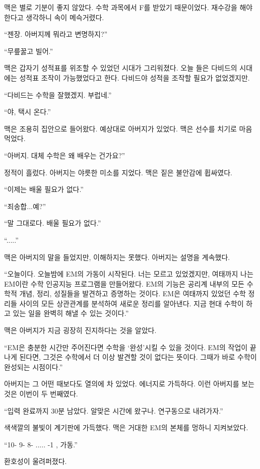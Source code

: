 \documentclass[9pt,showtrims,twoside,openright,chapter]{oblivoir}
\begin{document}
 맥은 별로 기분이 좋지 않았다. 수학 과목에서 F를 받았기 때문이었다. 재수강을 해야 한다고 생각하니 속이 메슥거렸다. \par
 “젠장. 아버지께 뭐라고 변명하지?” \par
 “무릎꿇고 빌어.” \par
 맥은 갑자기 성적표를 위조할 수 있었던 시대가 그리워졌다. 오늘 들은 다비드의 시대에는 성적표 조작이 가능했었다고 한다. 다비드야 성적을 조작할 필요가 없었겠지만. \par
 “다비드는 수학을 잘했겠지. 부럽네.” \par
 “야, 택시 온다.”
\\ \par
 맥은 조용히 집안으로 들어왔다. 예상대로 아버지가 있었다. 맥은 선수를 치기로 마음먹었다. \par
 “아버지. 대체 수학은 왜 배우는 건가요?” \par
 정적이 흘렀다. 아버지는 야릇한 미소를 지었다. 맥은 짙은 불안감에 휩싸였다. \par
 “이제는 배울 필요가 없다.” \par
 “죄송합...예?” \par
 “말 그대로다. 배울 필요가 없다.” \par
 “.....” \par
 맥은 아버지의 말을 들었지만, 이해하지는 못했다. 아버지는 설명을 계속했다. \par
 “오늘이다. 오늘밤에 EM의 가동이 시작된다. 너는 모르고 있었겠지만, 여태까지 나는 EM이란 수학 인공지능 프로그램을 만들어왔다. EM의 기능은 공리계 내부의 모든 수학적 개념, 정리, 성질들을 발견하고 증명하는 것이다. EM은 여태까지 있었던 수학 정리들 사이의 모든 상관관계를 분석하여 새로운 정리를 알아낸다. 지금 현대 수학이 하고 있는 일을 완벽히 해낼 수 있는 것이다.” \par
 맥은 아버지가 지금 굉장히 진지하다는 것을 알았다. \par
 “EM은 충분한 시간만 주어진다면 수학을 ‘완성’시킬 수 있을 것이다. EM의 작업이 끝나게 된다면, 그것은 수학에서 더 이상 발견할 것이 없다는 뜻이다. 그때가 바로 수학이 완성되는 시점이다.” \par
 아버지는 그 어떤 때보다도 열의에 차 있었다. 에너지로 가득하다. 이런 아버지를 보는 것은 이번이 두 번째였다. \par
 “입력 완료까지 30분 남았다. 알맞은 시간에 왔구나. 연구동으로 내려가자.”
 \\ \par
 
 색색깔의 불빛이 계기판에 가득했다. 맥은 거대한 EM의 본체를 멍하니 지켜보았다. \par
 “10- 9- 8- ..... -1 , 가동.” \par
 환호성이 울려퍼졌다.
 \\ \par 
\end{document}
